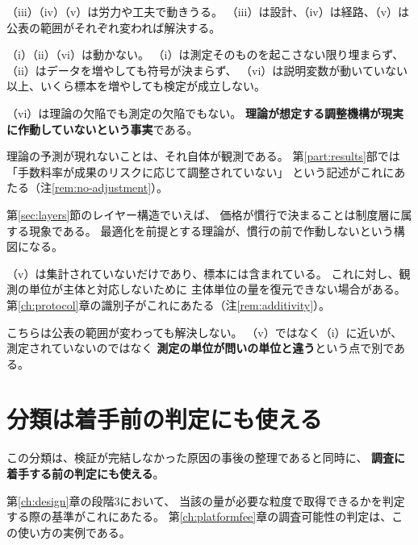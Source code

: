 （iii）（iv）（v）は労力や工夫で動きうる。
（iii）は設計、（iv）は経路、（v）は公表の範囲がそれぞれ変われば解決する。

（i）（ii）（vi）は動かない。
（i）は測定そのものを起こさない限り埋まらず、
（ii）はデータを増やしても符号が決まらず、
（vi）は説明変数が動いていない以上、いくら標本を増やしても検定が成立しない。

\begin{remark}[（vi）は否定的な結果ではない]
\label{rem:vi-is-observation}
（vi）は理論の欠陥でも測定の欠陥でもない。
\textbf{理論が想定する調整機構が現実に作動していないという事実}である。

理論の予測が現れないことは、それ自体が観測である。
第\ref{part:results}部では「手数料率が成果のリスクに応じて調整されていない」
という記述がこれにあたる（注\ref{rem:no-adjustment}）。

第\ref{sec:layers}節のレイヤー構造でいえば、
価格が慣行で決まることは制度層に属する現象である。
最適化を前提とする理論が、慣行の前で作動しないという構図になる。
\end{remark}

\begin{remark}[集計の不能は集計の選択と異なる]
\label{rem:agg-impossible}
（v）は集計されていないだけであり、標本には含まれている。
これに対し、観測の単位が主体と対応しないために
主体単位の量を復元できない場合がある。
第\ref{ch:protocol}章の識別子がこれにあたる（注\ref{rem:additivity}）。

こちらは公表の範囲が変わっても解決しない。
（v）ではなく（i）に近いが、測定されていないのではなく
\textbf{測定の単位が問いの単位と違う}という点で別である。
\end{remark}

\section{分類は着手前の判定にも使える}

この分類は、検証が完結しなかった原因の事後の整理であると同時に、
\textbf{調査に着手する前の判定にも使える}。

第\ref{ch:design}章の段階3において、
当該の量が必要な粒度で取得できるかを判定する際の基準がこれにあたる。
第\ref{ch:platformfee}章の調査可能性の判定は、この使い方の実例である。

